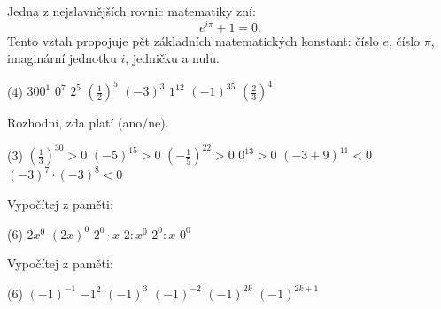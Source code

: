 \documentclass[12pt,a4paper]{article}
\begin{document}
\begin{historicalbox}
Jedna z nejslavnějších rovnic matematiky zní:
\[
e^{i\pi} + 1 = 0.
\]
Tento vztah propojuje pět základních matematických konstant: číslo $e$, číslo $\pi$, imaginární jednotku $i$, jedničku a nulu.
\end{historicalbox}






\exercisepart
\setcounter{section}{1}

\begin{exercise}
    \begin{tasks}(4)
        \task $300^{1}$
        \task $0^{7}$
        \task $2^{5}$
        \task $\left(\tfrac{1}{2}\right)^{5}$
        \task $(-3)^{3}$
        \task $1^{12}$
        \task $(-1)^{35}$
        \task $\left(\tfrac{2}{3}\right)^{4}$
    \end{tasks}
\end{exercise}


\begin{exercise}
    Rozhodni, zda platí (ano/ne).  
    \begin{tasks}(3)
        \task $\left(\tfrac{1}{3}\right)^{30} > 0$
        \task $(-5)^{15} > 0$
        \task $\left(-\tfrac{1}{5}\right)^{22} > 0$
        \task $0^{13} > 0$
        \task $(-3+9)^{11} < 0$
        \task $(-3)^{7}\cdot(-3)^{8} < 0$
    \end{tasks}
\end{exercise}


\begin{exercise}
    Vypočítej z paměti:
    \begin{tasks}(6)
        \task $2x^{0}$
        \task $(2x)^{0}$
        \task $2^{0} \cdot x$
        \task $2 : x^{0}$
        \task $2^{0} : x$
        \task $0^{0}$
    \end{tasks}
\end{exercise}


\begin{exercise}
    Vypočítej z paměti:
    \begin{tasks}(6)
        \task $(-1)^{-1}$
        \task $-1^{2}$
        \task $(-1)^{3}$
        \task $(-1)^{-2}$
        \task $(-1)^{2k}$
        \task $(-1)^{2k+1}$
    \end{tasks}
\end{exercise}
\end{document}
